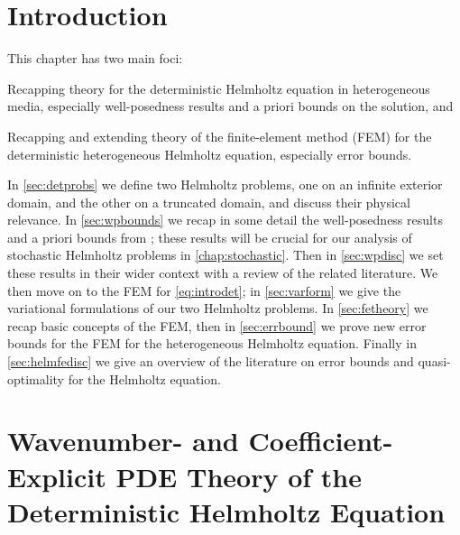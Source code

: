 \section{Introduction}
This chapter has two main foci:
\ben
\item Recapping theory for the deterministic Helmholtz equation in heterogeneous media, especially well-posedness results and a priori bounds on the solution, and
\item Recapping and extending theory of the finite-element method (FEM) for the deterministic heterogeneous Helmholtz equation, especially error bounds.
  \een


In \cref{sec:detprobs} we  define two Helmholtz problems, one on an infinite exterior domain, and the other on a truncated domain, and discuss their physical relevance. In \cref{sec:wpbounds} we  recap in some detail the well-posedness results and a priori bounds from \cite{GrPeSp:19}; these results will be crucial for our analysis of stochastic Helmholtz problems in \cref{chap:stochastic}. Then in \cref{sec:wpdisc} we set these results in their wider context with a review of the related literature. We  then move on to the FEM for \eqref{eq:introdet}; in \cref{sec:varform} we give the variational formulations of our two Helmholtz problems. In \cref{sec:fetheory} we recap basic concepts of the FEM, then in \cref{sec:errbound} we  prove new error bounds for the FEM for the heterogeneous Helmholtz equation. Finally in \cref{sec:helmfedisc} we  give an overview of the literature on error bounds and quasi-optimality for the Helmholtz equation.


\section{Wavenumber- and Coefficient-Explicit PDE Theory of the Deterministic Helmholtz Equation}\label{sec:pdetheory}
  

